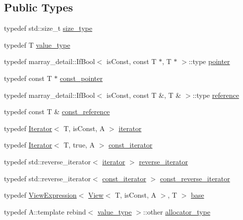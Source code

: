 \subsection*{Public Types}
\begin{DoxyCompactItemize}
\item 
typedef std\+::size\+\_\+t \hyperlink{classandres_1_1View_aa80ab78f6e3a32ead389d657f6ec7308}{size\+\_\+type}
\item 
typedef T \hyperlink{classandres_1_1View_abe3d48ac2b0d65536e54dbfad0a44929}{value\+\_\+type}
\item 
typedef marray\+\_\+detail\+::\+If\+Bool$<$ is\+Const, const T $\ast$, T $\ast$ $>$\+::type \hyperlink{classandres_1_1View_a9a201594c82be89fccd0fe644ea2f09c}{pointer}
\item 
typedef const T $\ast$ \hyperlink{classandres_1_1View_a947d02064bced23437b804a8050e6ccb}{const\+\_\+pointer}
\item 
typedef marray\+\_\+detail\+::\+If\+Bool$<$ is\+Const, const T \&, T \& $>$\+::type \hyperlink{classandres_1_1View_aebdd1f19272b743b4422ff8ba18fc11a}{reference}
\item 
typedef const T \& \hyperlink{classandres_1_1View_a69e3d49e3d8242a33c03d42dd5ecc5b8}{const\+\_\+reference}
\item 
typedef \hyperlink{classandres_1_1Iterator}{Iterator}$<$ T, is\+Const, A $>$ \hyperlink{classandres_1_1View_aef54ee0a58e755b897398493d05a44df}{iterator}
\item 
typedef \hyperlink{classandres_1_1Iterator}{Iterator}$<$ T, true, A $>$ \hyperlink{classandres_1_1View_a7b6f125a7b3830f30cd34887b61858a7}{const\+\_\+iterator}
\item 
typedef std\+::reverse\+\_\+iterator$<$ \hyperlink{classandres_1_1View_aef54ee0a58e755b897398493d05a44df}{iterator} $>$ \hyperlink{classandres_1_1View_aab07af42756759420211d114bb705547}{reverse\+\_\+iterator}
\item 
typedef std\+::reverse\+\_\+iterator$<$ \hyperlink{classandres_1_1View_a7b6f125a7b3830f30cd34887b61858a7}{const\+\_\+iterator} $>$ \hyperlink{classandres_1_1View_a61656971b73a48c8bf009e3200aad900}{const\+\_\+reverse\+\_\+iterator}
\item 
typedef \hyperlink{classandres_1_1ViewExpression}{View\+Expression}$<$ \hyperlink{classandres_1_1View}{View}$<$ T, is\+Const, A $>$, T $>$ \hyperlink{classandres_1_1View_ac9b2563b59f4fe1d90144bc4be2a2008}{base}
\item 
typedef A\+::template rebind$<$ \hyperlink{classandres_1_1View_abe3d48ac2b0d65536e54dbfad0a44929}{value\+\_\+type} $>$\+::other \hyperlink{classandres_1_1View_a175e5862a7133a937e7901e5894c2e10}{allocator\+\_\+type}
\end{DoxyCompactItemize}
